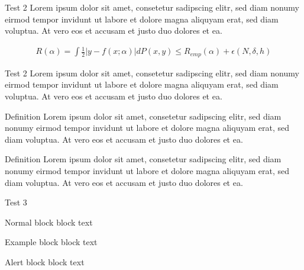 \documentclass{beamer}
\begin{document}
        \begin{frame}{Test 2}
       	    Lorem ipsum dolor sit amet, consetetur sadipscing elitr, sed diam nonumy eirmod tempor invidunt ut labore et dolore magna aliquyam erat, sed diam voluptua. At vero eos et accusam et justo duo dolores et ea.

            \begin{align}
                R(\alpha) = \int \frac{1}{2} |y - f(x;\alpha)| dP(x,y) \leq R_{emp}(\alpha) + \epsilon(N, \delta, h)
            \end{align}   
        \end{frame}

   
        \begin{frame}{Test 2}
                Lorem ipsum dolor sit amet, consetetur sadipscing elitr, sed diam nonumy eirmod tempor invidunt ut labore et dolore magna aliquyam erat, sed diam voluptua. At vero eos et accusam et justo duo dolores et ea.
            \begin{block}{Definition}
                Lorem ipsum dolor sit amet, consetetur sadipscing elitr, sed diam nonumy eirmod tempor invidunt ut labore et dolore magna aliquyam erat, sed diam voluptua. At vero eos et accusam et justo duo dolores et ea.
            \end{block}
            \pause
            \begin{block}{Definition}
                Lorem ipsum dolor sit amet, consetetur sadipscing elitr, sed diam nonumy eirmod tempor invidunt ut labore et dolore magna aliquyam erat, sed diam voluptua. At vero eos et accusam et justo duo dolores et ea.
            \end{block}
        \end{frame}

        \begin{frame}{Test 3}
            \begin{block}{Normal block}
            block text
            \end{block}
            
            \begin{exampleblock}{Example block}
            block text
            \end{exampleblock}
            
            
            \begin{alertblock}{Alert block}
            block text
            \end{alertblock}
        \end{frame}
\end{document}
